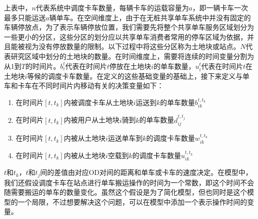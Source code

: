 \documentclass[]{tongjithesis}
\numberwithin{equation}{chapter}
\begin{document}
上表中，$n$代表系统中调度卡车数量，每辆卡车的运载容量为$a$，即一辆卡车一次最多只能运送$a$辆单车。在空间维度上，由于在无桩共享单车系统中并没有固定的车辆停放点，为了表示车辆停放位置，我们需要先将整个共享单车服务区域划分为一些更小的分区，这些分区的划分应以共享单车消费者常用的停车区域为依据，并且能被视为没有停放数量的限制。以下过程中将这些分区称为土地块或站点。$N$代表研究区域中划分的土地块的数量。在时间维度上，需要将连续的时间变量分割为从1到$T$的时间片。$b_i^t$代表在时间片$t$停放在土地块$i$的单车数量，$u_i^t$代表在时间片$t$在土地块$i$等候的调度卡车数量。在定义的这些基础变量的基础上，接下来定义与单车和卡车在不同时间片内移动有关的决策变量如下：
\begin{enumerate}
	\item 在时间片$[t,t_k]$内被调度卡车从土地块$i$运送到$k$的单车数量$b_{ik}^{t,t_k}$
	\item 在时间片$[t,t_k]$内被用户从土地块$i$骑到$k$的单车数量$d_{ij}^{t,t_j}$
	\item 在时间片$[t,t_k]$内被从土地块$i$运送单车到$k$的调度卡车数量$w_{ik}^{t,t_k}$
	\item 在时间片$[t,t_k]$内被从土地块$i$空载到$k$的调度卡车数量$u_{ik}^{t,t_k}$
\end{enumerate}

$t$和$t_k$，$t$和$t_j$间的差值由对应OD对间的距离和单车或卡车的速度决定。在模型中，我们还假设调度卡车在站点进行单车搬运操作的时间为一个常数，即这个时间不会随需要搬运的单车的数量变化。虽然这个假设是为了简化模型，但也同时是这个模型的一个局限，不过想要解决这个问题，可以在模型中添加一个表示操作时间的变量。
\end{document}
